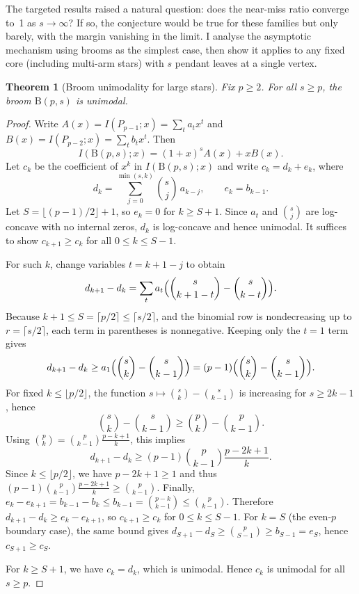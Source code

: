 \documentclass[12pt,oneside]{article}
\newtheorem{theorem}{Theorem}
\theoremstyle{remark}
\newcommand{\broom}{\mathrm{B}}           %
\begin{document}
The targeted results raised a natural question: does the near-miss ratio converge to~1 as $s \to \infty$?
If so, the conjecture would be true for these families but only barely, with the margin vanishing in the limit.
I analyse the asymptotic mechanism using brooms as the simplest case, then show it applies to any fixed core (including multi-arm stars) with $s$ pendant leaves at a single vertex.

\begin{theorem}[Broom unimodality for large stars]\label{thm:broom-sgeqp}
Fix $p \ge 2$. For all $s \ge p$, the broom $\broom(p,s)$ is unimodal.
\end{theorem}

\begin{proof}
Write $A(x) = I(P_{p-1}; x) = \sum_t a_t x^t$ and $B(x) = I(P_{p-2}; x) = \sum_t b_t x^t$.
Then
\[
  I(\broom(p,s); x) = (1+x)^s A(x) + x B(x).
\]
Let $c_k$ be the coefficient of $x^k$ in $I(\broom(p,s); x)$ and write $c_k = d_k + e_k$, where
\[
  d_k = \sum_{j=0}^{\min(s,k)} \binom{s}{j}\, a_{k-j}, \qquad e_k = b_{k-1}.
\]
Let $S = \lfloor (p-1)/2 \rfloor + 1$, so $e_k = 0$ for $k \ge S+1$.
Since $a_t$ and $\binom{s}{j}$ are log-concave with no internal zeros, $d_k$ is log-concave and hence unimodal.
It suffices to show $c_{k+1} \ge c_k$ for all $0 \le k \le S-1$.

For such $k$, change variables $t = k+1-j$ to obtain
\[
  d_{k+1} - d_k = \sum_t a_t\Bigl(\binom{s}{k+1-t} - \binom{s}{k-t}\Bigr).
\]
Because $k+1 \le S = \lceil p/2 \rceil \le \lceil s/2 \rceil$, and the binomial row is nondecreasing up to $r = \lceil s/2 \rceil$,
each term in parentheses is nonnegative.
Keeping only the $t=1$ term gives
\[
  d_{k+1} - d_k \ge a_1\Bigl(\binom{s}{k} - \binom{s}{k-1}\Bigr) = (p-1)\Bigl(\binom{s}{k} - \binom{s}{k-1}\Bigr).
\]
For fixed $k \le \lfloor p/2 \rfloor$, the function $s \mapsto \binom{s}{k} - \binom{s}{k-1}$ is increasing for $s \ge 2k-1$, hence
\[
  \binom{s}{k} - \binom{s}{k-1} \ge \binom{p}{k} - \binom{p}{k-1}.
\]
Using $\binom{p}{k} = \binom{p}{k-1}\frac{p-k+1}{k}$, this implies
\[
  d_{k+1} - d_k \ge (p-1)\binom{p}{k-1}\frac{p-2k+1}{k}.
\]
Since $k \le \lfloor p/2 \rfloor$, we have $p-2k+1 \ge 1$ and thus
$(p-1)\binom{p}{k-1}\frac{p-2k+1}{k} \ge \binom{p}{k-1}$.
Finally, $e_k - e_{k+1} = b_{k-1} - b_k \le b_{k-1} = \binom{p-k}{k-1} \le \binom{p}{k-1}$.
Therefore $d_{k+1} - d_k \ge e_k - e_{k+1}$, so $c_{k+1} \ge c_k$ for $0 \le k \le S-1$.
For $k=S$ (the even-$p$ boundary case), the same bound gives
$d_{S+1}-d_S \ge \binom{p}{S-1} \ge b_{S-1}=e_S$, hence $c_{S+1}\ge c_S$.

For $k \ge S+1$, we have $c_k = d_k$, which is unimodal. Hence $c_k$ is unimodal for all $s \ge p$.
\end{proof}
\end{document}
